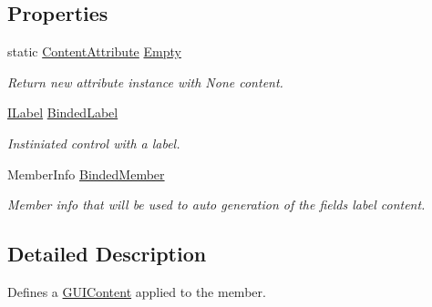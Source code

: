 \subsection*{Properties}
\begin{DoxyCompactItemize}
\item 
static \mbox{\hyperlink{class_wpf_handler_1_1_u_i_1_1_auto_layout_1_1_configuration_1_1_content_attribute}{Content\+Attribute}} \mbox{\hyperlink{class_wpf_handler_1_1_u_i_1_1_auto_layout_1_1_configuration_1_1_content_attribute_a7342c312b16ecde3884a20ae56879485}{Empty}}
\begin{DoxyCompactList}\small\item\em Return new attribute instance with None content. \end{DoxyCompactList}\item 
\mbox{\hyperlink{interface_wpf_handler_1_1_u_i_1_1_controls_1_1_i_label}{I\+Label}} \mbox{\hyperlink{class_wpf_handler_1_1_u_i_1_1_auto_layout_1_1_configuration_1_1_content_attribute_a27ac4fe8d5fdf953c624a099b7c33ac4}{Binded\+Label}}
\begin{DoxyCompactList}\small\item\em Instiniated control with a label. \end{DoxyCompactList}\item 
Member\+Info \mbox{\hyperlink{class_wpf_handler_1_1_u_i_1_1_auto_layout_1_1_configuration_1_1_content_attribute_ac04878f4eb3c6ceb3c3f5c726fc34d50}{Binded\+Member}}
\begin{DoxyCompactList}\small\item\em Member info that will be used to auto generation of the field\textquotesingle{}s label content. \end{DoxyCompactList}\end{DoxyCompactItemize}


\subsection{Detailed Description}
Defines a \mbox{\hyperlink{class_wpf_handler_1_1_u_i_1_1_g_u_i_content}{G\+U\+I\+Content}} applied to the member. 



